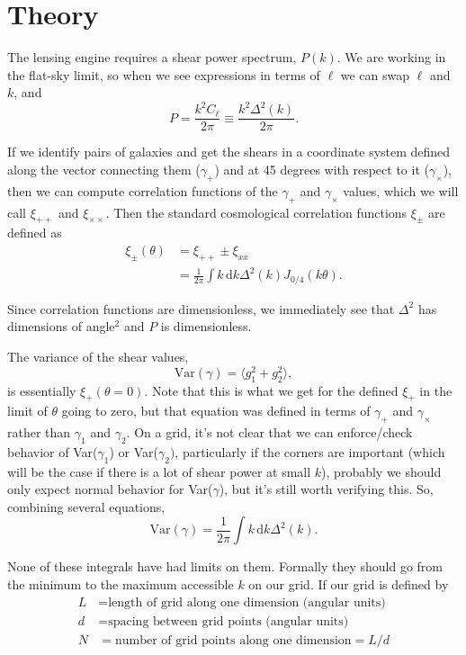 \documentclass[preprint]{aastex}
\newcommand{\rmd}{\ensuremath{\mathrm{d}}}
\newcommand{\beq}{\begin{equation}}
\newcommand{\eeq}{\end{equation}}
\begin{document}
\section{Theory}

The lensing engine requires a shear power spectrum, $P(k)$.  We are
working in the flat-sky limit, so when we see expressions in terms of
$\ell$ we can swap $\ell$ and $k$, and
\beq
P = \frac{k^2 C_{\ell}}{2\pi}\equiv \frac{k^2 \Delta^2(k)}{2\pi}.
\eeq

If we identify pairs of galaxies and get the shears in a coordinate
system defined along the vector connecting them ($\gamma_+$) and at 45
degrees with respect to it ($\gamma_\times$), then we can compute
correlation functions of the $\gamma_+$ and $\gamma_\times$ values,
which we will call $\xi_{++}$ and $\xi_{\times\times}$.  Then the
standard cosmological correlation functions $\xi_{\pm}$ are defined as
\begin{align}
\xi_{\pm}(\theta) &=  \xi_{++}\pm \xi_{xx} \\
 &= \frac{1}{2\pi}\int k\,\rmd k \Delta^2(k) J_{0/4}(k\theta).
\end{align}

Since correlation functions are dimensionless, we immediately see that
$\Delta^2$ has dimensions of angle$^2$ and $P$ is dimensionless.

The variance of the shear values, 
\beq
\mathrm{Var}(\gamma) = \langle g_1^2 + g_2^2\rangle,
\eeq
is essentially $\xi_+(\theta=0)$.   Note that this is what we get for
the defined $\xi_+$ in the limit of $\theta$ going to zero, but that
equation was defined in terms of $\gamma_+$ and $\gamma_\times$ rather
than $\gamma_1$ and $\gamma_2$.  On a grid, it's not clear that we
can enforce/check behavior of Var($\gamma_1$) or Var($\gamma_2)$,
particularly if the corners are important (which will be the case if
there is a lot of shear power at small $k$), probably we should 
 only expect normal behavior for Var($\gamma$), but it's still worth
 verifying this.  So, combining several equations,
\beq\label{E:shearvar}
\mathrm{Var}(\gamma) = \frac{1}{2\pi}\int k\,\rmd k \Delta^2(k).
\eeq

None of these integrals have had limits on them.  Formally they should
go from the minimum to the maximum accessible $k$ on our grid.  If our
grid is defined by
\begin{align}
L &= \mbox{length of grid along one dimension (angular units)}\\
d &= \mbox{spacing between grid points (angular units)}\\
N &= \mbox{number of grid points along one dimension} = L/d
\end{align}
\end{document}
